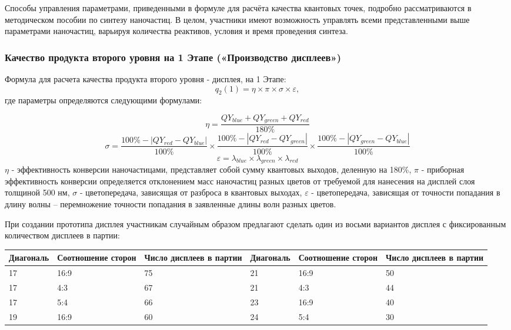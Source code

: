 Способы управления параметрами, приведенными в формуле для расчёта качества квантовых точек, подробно рассматриваются в методическом пособии по синтезу наночастиц. В целом, участники имеют возможность управлять всеми представленными выше параметрами наночастиц, варьируя количества реактивов, условия и время проведения синтеза. 

\subsubsection*{Качество продукта второго уровня на 1 Этапе («Производство дисплеев»)}

Формула для расчета качества продукта второго уровня - дисплея, на 1 Этапе:
$$q_2 (1)= \eta \times \pi \times \sigma \times \varepsilon ,$$
где параметры определяются следующими формулами:

$$\eta =  \frac{QY_{blue}+QY_{green}+QY_{red}}{180\%}$$
$$\sigma =\frac{100\%-|QY_{red}-QY_{blue} |}{100\%}\times \frac{100\%-|QY_{red}-QY_{green} |}{100\%}\times \frac{100\%-|QY_{green}-QY_{blue} |}{100\%}$$
$$\varepsilon = \lambda_{blue}\times \lambda_{green}\times \lambda_{red}$$
$\eta$ - эффективность конверсии наночастицами, представляет собой сумму квантовых выходов, деленную на 180\%,  $\pi$ - приборная эффективность конверсии определяется отклонением масс наночастиц разных цветов от требуемой для нанесения на дисплей слоя толщиной 500 нм, $\sigma$ - цветопередача, зависящая от разброса в квантовых выходах, $\varepsilon$ - цветопередача, зависящая от точности попадания в длину волны – перемножение точности попадания в заявленные длины волн разных цветов.

При создании прототипа дисплея участникам случайным образом предлагают сделать один из восьми вариантов дисплея с фиксированным количеством дисплеев в партии:

\begin{table}[H]
	\begin{center}
		\begin{tabular}{|p{2cm}|p{2.5cm}|p{2cm}|p{2cm}|p{2.5cm}|p{2cm}|}
			\hline
			Диагональ	&Соотношение сторон	&Число дисплеев в партии	&Диагональ	&Соотношение сторон	&Число дисплеев в партии \\
			\hline
			17	&16:9	&75&	21&	16:9&	50 \\
			\hline
			17&	4:3	&67&	21&	4:3&	44 \\
			\hline
			17	&5:4&	66&	23&	16:9&	40 \\
			\hline
			19&	16:9&	60&	24	&5:4	&30 \\
			\hline
		\end{tabular}
	\end{center}
\end{table}

